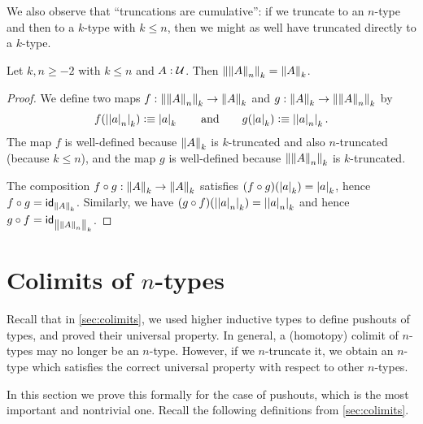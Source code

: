 We also observe that ``truncations are cumulative'': if we truncate to an $n$-type and then to a $k$-type with $k\le n$, then we might as
well have truncated directly to a $k$-type.

\begin{lem} \label{lem:truncation-le}
  Let $k,n\ge-2$ with $k\le{}n$ and $A:\type$. Then
  $\trunc k{\trunc nA}=\trunc kA$.
\end{lem}
\begin{proof}
  We define two maps $f:\trunc k{\trunc nA}\to\trunc kA$ and
  $g:\trunc kA\to\trunc k{\trunc nA}$ by
  \[
   f(\tproj k{\tproj na}) \defeq \tproj ka
   \qquad\text{and}\qquad
   g(\tproj ka) \defeq \tproj k{\tproj na}.
  \]
  The map $f$ is well-defined because $\trunc kA$ is $k$-truncated and also
  $n$-truncated (because $k\le{}n$), and the map $g$ is well-defined because
  $\trunc k{\trunc nA}$ is $k$-truncated.

  The composition $f\circ{}g:\trunc kA\to\trunc kA$ satisfies
  $(f\circ{}g)(\tproj ka)=\tproj ka$, hence $f\circ{}g=\idfunc[\trunc kA]$.
  Similarly, we have $(g\circ{}f)(\tproj k{\tproj na})=\tproj k{\tproj na}$ and hence $g\circ{}f=\idfunc[\trunc k{\trunc nA}]$.
\end{proof}



\section{Colimits of \texorpdfstring{$n$}{n}-types}
\label{sec:pushouts}

Recall that in \autoref{sec:colimits}, we used higher inductive types to define pushouts of types, and proved their universal property.
In general, a (homotopy) colimit of $n$-types may no longer be an $n$-type.
However, if we $n$-truncate it, we obtain an $n$-type which satisfies the correct universal property with respect to other $n$-types.

In this section we prove this formally for the case of pushouts, which is the most important and nontrivial one.
Recall the following definitions from \autoref{sec:colimits}.

